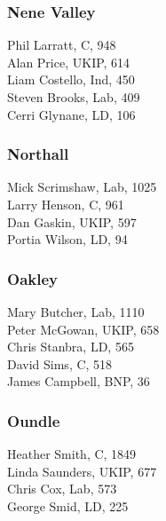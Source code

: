 \documentclass[a4paper,openany,10pt]{book}
\begin{document}
\subsubsection*{Nene Valley}



Phil Larratt, C, 948\\
Alan Price, UKIP, 614\\
Liam Costello, Ind, 450\\
Steven Brooks, Lab, 409\\
Cerri Glynane, LD, 106\\


\subsubsection*{Northall}



Mick Scrimshaw, Lab, 1025\\
Larry Henson, C, 961\\
Dan Gaskin, UKIP, 597\\
Portia Wilson, LD, 94\\


\subsubsection*{Oakley}



Mary Butcher, Lab, 1110\\
Peter McGowan, UKIP, 658\\
Chris Stanbra, LD, 565\\
David Sims, C, 518\\
James Campbell, BNP, 36\\


\subsubsection*{Oundle}



Heather Smith, C, 1849\\
Linda Saunders, UKIP, 677\\
Chris Cox, Lab, 573\\
George Smid, LD, 225\\
\end{document}
